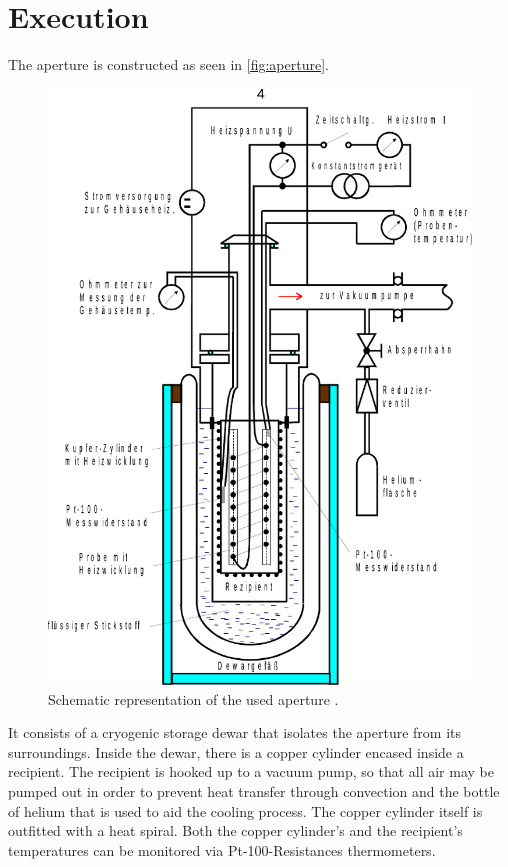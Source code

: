 \section{Execution}
\label{sec:Durchführung}

The aperture is constructed as seen in \autoref{fig:aperture}.

\begin{figure}[H]
    \centering
    \includegraphics[]{figures/apparature.pdf}
    \caption{Schematic representation of the used aperture \cite{v47}.}
    \label{fig:aperture}
\end{figure}

It consists of a cryogenic storage dewar that isolates the aperture from its surroundings. Inside the dewar, there is a copper cylinder encased inside a recipient.
The recipient is hooked up to a vacuum pump, so that all air may be pumped out in order to prevent heat transfer through convection and the bottle of helium that is used to aid the cooling process.
The copper cylinder itself is outfitted with a heat spiral.
Both the copper cylinder's and the recipient's temperatures can be monitored via Pt-100-Resistances thermometers. \\

